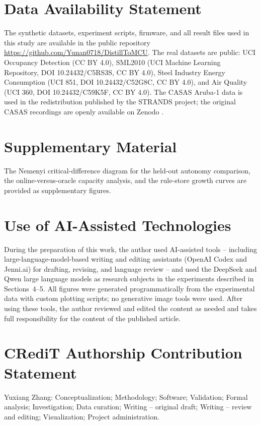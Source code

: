 \documentclass[11pt,a4paper]{article}
\begin{document}
\section*{Data Availability Statement}
The synthetic datasets, experiment scripts, firmware, and all result files
used in this study are available in the public repository
\url{https://github.com/Yunan0718/DistillToMCU}.
The real datasets are public: UCI Occupancy Detection (CC BY 4.0), SML2010
(UCI Machine Learning Repository, DOI 10.24432/C5RS3S, CC BY 4.0), Steel
Industry Energy Consumption (UCI 851, DOI 10.24432/C52G8C, CC BY 4.0), and
Air Quality (UCI 360, DOI 10.24432/C59K5F, CC BY 4.0). The CASAS Aruba-1
data is used in the redistribution published by the STRANDS project; the
original CASAS recordings are openly available on Zenodo \cite{32}.

\section*{Supplementary Material}
The Nemenyi critical-difference diagram for the held-out autonomy comparison,
the online-versus-oracle capacity analysis, and the rule-store growth curves
are provided as supplementary figures.

\section*{Use of AI-Assisted Technologies}
During the preparation of this work, the author used AI-assisted tools --
including large-language-model-based writing and editing assistants (OpenAI
Codex and Jenni.ai) for drafting, revising, and language review -- and used
the DeepSeek and Qwen large language models as research subjects in the
experiments described in Sections~4--5. All figures were generated
programmatically from the experimental data with custom plotting scripts;
no generative image tools were used. After using these tools, the author
reviewed and edited the content as needed and takes full responsibility for
the content of the published article.

\section*{CRediT Authorship Contribution Statement}
Yuxiang Zhang: Conceptualization; Methodology; Software; Validation; Formal
analysis; Investigation; Data curation; Writing -- original draft; Writing --
review and editing; Visualization; Project administration.
\end{document}
